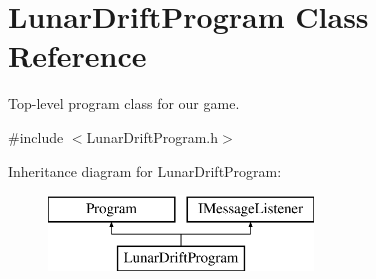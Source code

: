 \hypertarget{class_lunar_drift_program}{}\section{Lunar\+Drift\+Program Class Reference}
\label{class_lunar_drift_program}


Top-\/level program class for our game.  




{\ttfamily \#include $<$Lunar\+Drift\+Program.\+h$>$}

Inheritance diagram for Lunar\+Drift\+Program\+:\begin{figure}[H]
\begin{center}
\leavevmode
\includegraphics[height=2.000000cm]{class_lunar_drift_program}
\end{center}
\end{figure}
